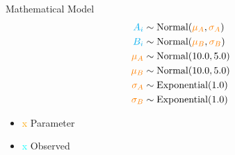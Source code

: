 \documentclass[aspectratio=169,xcolor=svgnames]{beamer}
\begin{document}
\newcommand{\parameter}[1]{\textcolor{orange}{#1}}
\newcommand{\observed}[1]{\textcolor{cyan}{#1}}

\newcommand{\normal}[1]{\text{Normal}(#1)}
\newcommand{\exponential}[1]{\text{Exponential}(#1)}

\begin{frame}{Mathematical Model}
  \begin{align*}
    \observed{A_i} &\sim \normal{\parameter{\mu_A}, \parameter{\sigma_A}}\\
    \observed{B_i} &\sim \normal{\parameter{\mu_B}, \parameter{\sigma_B}}\\
    \parameter{\mu_A} &\sim \normal{10.0, 5.0}\\
    \parameter{\mu_B} &\sim \normal{10.0, 5.0}\\
    \parameter{\sigma_A} &\sim \exponential{1.0}\\
    \parameter{\sigma_B} &\sim \exponential{1.0}\\
  \end{align*}

  \begin{itemize}
  \item \parameter{x} Parameter
  \item \observed{x} Observed
  \end{itemize}
\end{frame}
\end{document}
